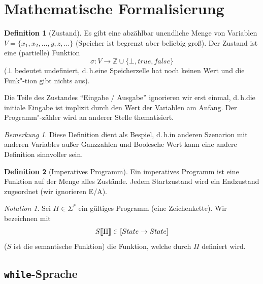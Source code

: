 \documentclass[a4paper,12pt]{article}
\theoremstyle{definition}
\newtheorem{definition}{Definition}[section]
\theoremstyle{plain}
\theoremstyle{remark}
\newtheorem*{remark}{Bemerkung}
\newtheorem*{notation}{Notation}
\newcommand{\lsem}{\mathrm{[}\kern-.14em\mathrm{[}}
\newcommand{\rsem}{\mathrm{]}\kern-.14em\mathrm{]}}
\renewcommand{\dh}{d.\,h.\;}
\newcommand{\sem}[1]{S\lsem#1\rsem}
\begin{document}
\newpage
\section{Mathematische Formalisierung}

\begin{definition}[Zustand]
    Es gibt eine abzählbar unendliche Menge von Variablen $V = \{ x_1, x_2, \dots, y, z, \dots \}$ (Speicher ist begrenzt aber beliebig groß). Der Zustand ist eine (partielle) Funktion $$\sigma: V \to \mathbb{Z} \cup \{ \bot, true, false \}$$ ($\bot$ bedeutet undefiniert, \dh eine Speicherzelle hat noch keinen Wert und die Funk"-tion gibt nichts aus).

    Die Teile des Zustandes ``Eingabe / Ausgabe'' ignorieren wir erst einmal, \dh die initiale Eingabe ist implizit durch den Wert der Variablen am Anfang. Der Programm"-zähler wird an anderer Stelle thematisiert.
\end{definition}

\begin{remark}
    Diese Definition dient als Bespiel, \dh in anderen Szenarion mit anderen Variables außer Ganzzahlen und Boolesche Wert kann eine andere Definition sinnvoller sein.
\end{remark}

\begin{definition}[Imperatives Programm]
    Ein imperatives Programm ist eine Funktion auf der Menge alles Zustände. Jedem Startzustand wird ein Endzustand zugeordnet (wir ignorieren E/A).
\end{definition}

\begin{notation}
    Sei $\Pi \in \Sigma^*$ ein gültiges Programm (eine Zeichenkette). Wir bezeichnen mit
    $$\sem{\Pi} \in [State \to State]$$
    ($S$ ist die semantische Funktion) die Funktion, welche durch $\Pi$ definiert wird.
\end{notation}


\subsection{\texttt{while}-Sprache} \label{section:while}
\end{document}
